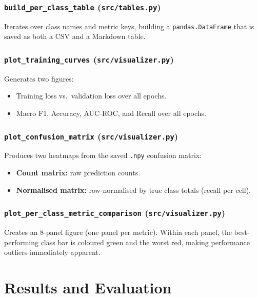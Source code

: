 \documentclass[12pt,a4paper]{report}
\begin{document}
\subsection{\texttt{build\_per\_class\_table} (\texttt{src/tables.py})}

Iterates over class names and metric keys, building a \texttt{pandas.DataFrame} that is saved as both a CSV and a Markdown table.

\subsection{\texttt{plot\_training\_curves} (\texttt{src/visualizer.py})}

Generates two figures:
\begin{itemize}[nosep]
  \item Training loss vs.\ validation loss over all epochs.
  \item Macro F1, Accuracy, AUC-ROC, and Recall over all epochs.
\end{itemize}

\subsection{\texttt{plot\_confusion\_matrix} (\texttt{src/visualizer.py})}

Produces two heatmaps from the saved \texttt{.npy} confusion matrix:
\begin{itemize}[nosep]
  \item \textbf{Count matrix:} raw prediction counts.
  \item \textbf{Normalised matrix:} row-normalised by true class totals (recall per cell).
\end{itemize}

\subsection{\texttt{plot\_per\_class\_metric\_comparison} (\texttt{src/visualizer.py})}

Creates an 8-panel figure (one panel per metric). Within each panel, the best-performing class bar is coloured green and the worst red, making performance outliers immediately apparent.

\chapter{Results and Evaluation}
\label{ch:results}
\end{document}
